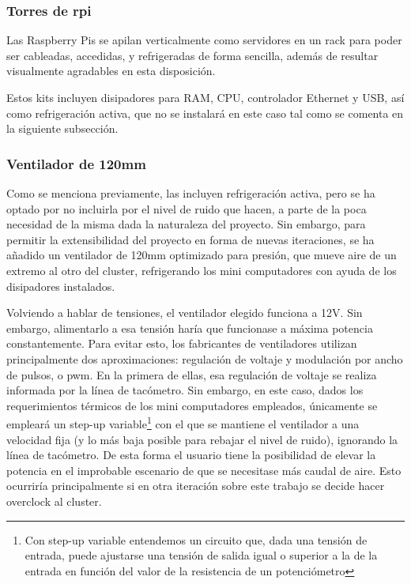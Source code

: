 
\subsubsection{Torres de \acrshort{rpi}}
\label{sssec:torresrpi}
Las Raspberry Pis se apilan verticalmente como servidores en un rack para poder ser cableadas, accedidas, y refrigeradas de forma sencilla, además de resultar visualmente agradables en esta disposición.

Estos kits incluyen disipadores para RAM, CPU, controlador Ethernet y USB, así como refrigeración activa, que no se instalará en este caso tal como se comenta en la siguiente subsección.


\subsubsection{Ventilador de 120mm}
Como se menciona previamente, las  incluyen refrigeración activa, pero se ha optado por no incluirla por el nivel de ruido que hacen, a parte de la poca necesidad de la misma dada la naturaleza del proyecto. Sin embargo, para permitir la extensibilidad del proyecto en forma de nuevas iteraciones, se ha añadido un ventilador de 120mm optimizado para presión, que mueve aire de un extremo al otro del cluster, refrigerando los mini computadores con ayuda de los disipadores instalados.

Volviendo a hablar de tensiones, el ventilador elegido funciona a 12V. Sin embargo, alimentarlo a esa tensión haría que funcionase a máxima potencia constantemente. Para evitar esto, los fabricantes de ventiladores utilizan principalmente dos aproximaciones: regulación de voltaje y modulación por ancho de pulsos, o \acrshort{pwm}. En la primera de ellas, esa regulación de voltaje se realiza informada por la línea de tacómetro. Sin embargo, en este caso,  dados los requerimientos térmicos de los mini computadores empleados, únicamente se empleará un step-up variable\footnote{Con step-up variable entendemos un circuito que, dada una tensión de entrada, puede ajustarse una tensión de salida igual o superior a la de la entrada en función del valor de la resistencia de un potenciómetro} con el que se mantiene el ventilador a una velocidad fija (y lo más baja posible para rebajar el nivel de ruido), ignorando la línea de tacómetro. De esta forma el usuario tiene la posibilidad de elevar la potencia en el improbable escenario de que se necesitase más caudal de aire. Esto ocurriría principalmente si en otra iteración sobre este trabajo se decide hacer overclock al cluster.

